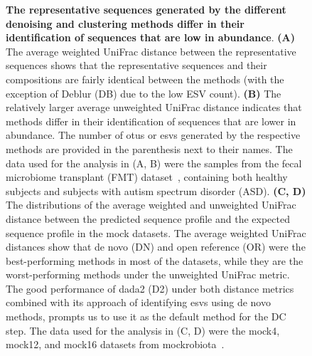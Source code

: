 \documentclass[letterpaper,12pt]{article}
\begin{document}
  \begin{figure}[H]
    \centering
    \caption{
      \textbf{The representative sequences generated by the different denoising and clustering methods differ in their identification of sequences that are low in abundance}.
      \textbf{(A)} The average weighted UniFrac distance between the representative sequences shows that the representative sequences and their compositions are fairly identical between the methods (with the exception of Deblur (DB) due to the low ESV count).
      \textbf{(B)} The relatively larger average unweighted UniFrac distance indicates that methods differ in their identification of sequences that are lower in abundance.
      The number of \ac{otu}s or \ac{esv}s generated by the respective methods are provided in the parenthesis next to their names.
      The data used for the analysis in (A, B) were the samples from the fecal microbiome transplant (FMT) dataset~\cite{Kang2017}, containing both healthy subjects and subjects with autism spectrum disorder (ASD).
      \textbf{(C, D)} The distributions of the average weighted and unweighted UniFrac distance between the predicted sequence profile and the expected sequence profile in the mock datasets.
      The average weighted UniFrac distances show that de novo (DN) and open reference (OR) were the best-performing methods in most of the datasets, while they are the worst-performing methods under the unweighted UniFrac metric.
      The good performance of dada2 (D2) under both distance metrics combined with its approach of identifying \ac{esv}s using de novo methods, prompts us to use it as the default method for the DC step.
      The data used for the analysis in (C, D) were the mock4, mock12, and mock16 datasets from mockrobiota~\cite{Bokulich2016}.
    }
    \label{fig:figure2}
  \end{figure}
\end{document}
